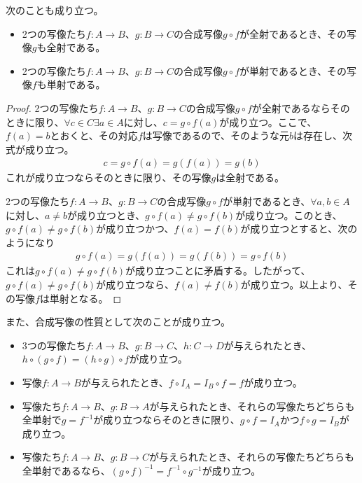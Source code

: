 \documentclass[dvipdfmx]{jsarticle}
\begin{document}
\begin{thm}
\label{1.2.3.15}
次のことも成り立つ。
\begin{itemize}
\item
  2つの写像たち$f:A \rightarrow B$、$g:B \rightarrow C$の合成写像$g \circ f$が全射であるとき、その写像$g$も全射である。
\item
  2つの写像たち$f:A \rightarrow B$、$g:B \rightarrow C$の合成写像$g \circ f$が単射であるとき、その写像$f$も単射である。
\end{itemize}
\end{thm}
\begin{proof}
2つの写像たち$f:A \rightarrow B$、$g:B \rightarrow C$の合成写像$g \circ f$が全射であるならそのときに限り、$\forall c \in C\exists a \in A$に対し、$c = g \circ f(a)$が成り立つ。ここで、$f(a) = b$とおくと、その対応$f$は写像であるので、そのような元$b$は存在し、次式が成り立つ。
\begin{align*}
c = g \circ f(a) = g\left( f(a) \right) = g(b)
\end{align*}
これが成り立つならそのときに限り、その写像$g$は全射である。\par
2つの写像たち$f:A \rightarrow B$、$g:B \rightarrow C$の合成写像$g \circ f$が単射であるとき、$\forall a,b \in A$に対し、$a \neq b$が成り立つとき、$g \circ f(a) \neq g \circ f(b)$が成り立つ。このとき、$g \circ f(a) \neq g \circ f(b)$が成り立つかつ、$f(a) = f(b)$が成り立つとすると、次のようになり
\begin{align*}
g \circ f(a) = g\left( f(a) \right) = g\left( f(b) \right) = g \circ f(b)
\end{align*}
これは$g \circ f(a) \neq g \circ f(b)$が成り立つことに矛盾する。したがって、$g \circ f(a) \neq g \circ f(b)$が成り立つなら、$f(a) \neq f(b)$が成り立つ。以上より、その写像$f$は単射となる。
\end{proof}
\begin{thm}
\label{1.2.3.16}
また、合成写像の性質として次のことが成り立つ。
\begin{itemize}
\item
  3つの写像たち$f:A \rightarrow B$、$g:B \rightarrow C$、$h:C \rightarrow D$が与えられたとき、$h \circ (g \circ f) = (h \circ g) \circ f$が成り立つ。
\item
  写像$f:A \rightarrow B$が与えられたとき、$f \circ I_{A} = I_{B} \circ f = f$が成り立つ。
\item
  写像たち$f:A \rightarrow B$、$g:B \rightarrow A$が与えられたとき、それらの写像たちどちらも全単射で$g = f^{- 1}$が成り立つならそのときに限り、$g \circ f = I_{A}$かつ$f \circ g = I_{B}$が成り立つ。
\item
  写像たち$f:A \rightarrow B$、$g:B \rightarrow C$が与えられたとき、それらの写像たちどちらも全単射であるなら、$(g \circ f)^{- 1} = f^{- 1} \circ g^{- 1}$が成り立つ。
\end{itemize}
\end{thm}
\end{document}

